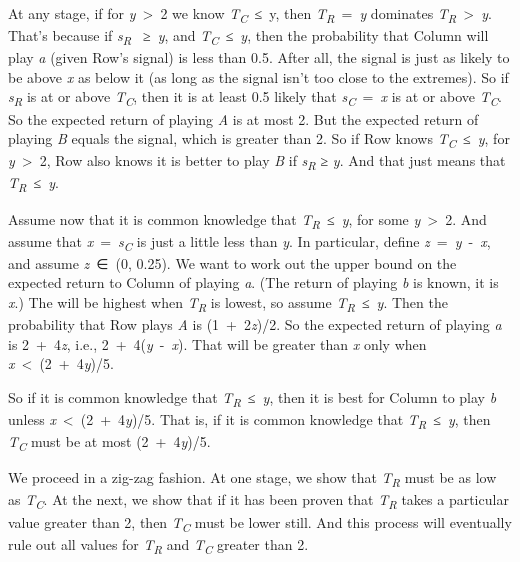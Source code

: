 \documentclass[
  12pt,
  letterpaper,
]{scrbook}
\begin{document}
At any stage, if for \emph{y}~\textgreater~2 we know
\emph{T\textsubscript{C}}~≤~y, then \emph{T\textsubscript{R}}~=~\emph{y}
dominates \emph{T\textsubscript{R}}~\textgreater~\emph{y}. That's
because if \emph{s\textsubscript{R}} ~≥~\emph{y}, and
\emph{T\textsubscript{C}}~≤~\emph{y}, then the probability that Column
will play \emph{a} (given Row's signal) is less than 0.5. After all, the
signal is just as likely to be above \emph{x} as below it (as long as
the signal isn't too close to the extremes). So if
\emph{s\textsubscript{R}} is at or above \emph{T\textsubscript{C}}, then
it is at least 0.5 likely that \emph{s\textsubscript{C}}~=~\emph{x} is
at or above \emph{T\textsubscript{C}}. So the expected return of playing
\emph{A} is at most 2. But the expected return of playing \emph{B}
equals the signal, which is greater than 2. So if Row knows
\emph{T\textsubscript{C}}~≤~\emph{y}, for \emph{y}~\textgreater~2, Row
also knows it is better to play \emph{B} if \emph{s\textsubscript{R}} ≥
\emph{y}. And that just means that \emph{T\textsubscript{R}}~≤~\emph{y}.

Assume now that it is common knowledge that
\emph{T\textsubscript{R}}~≤~\emph{y}, for some \emph{y}~\textgreater~2.
And assume that \emph{x}~=~\emph{s\textsubscript{C}} is just a little
less than \emph{y}. In particular, define
\emph{z}~=~\emph{y}~-~\emph{x}, and assume \emph{z}~∈~(0, 0.25). We want
to work out the upper bound on the expected return to Column of playing
\emph{a}. (The return of playing \emph{b} is known, it is \emph{x}.) The
will be highest when \emph{T\textsubscript{R}} is lowest, so assume
\emph{T\textsubscript{R}}~≤~\emph{y}. Then the probability that Row
plays \emph{A} is (1~+~2\emph{z})/2. So the expected return of playing
\emph{a} is 2~+~4\emph{z}, i.e., 2~+~4(\emph{y}~-~\emph{x}). That will
be greater than \emph{x} only when \emph{x}~\textless~(2~+~4\emph{y})/5.

So if it is common knowledge that \emph{T\textsubscript{R}}~≤~\emph{y},
then it is best for Column to play \emph{b} unless
\emph{x}~\textless~(2~+~4\emph{y})/5. That is, if it is common knowledge
that \emph{T\textsubscript{R}}~≤~\emph{y}, then
\emph{T\textsubscript{C}} must be at most (2~+~4\emph{y})/5.

We proceed in a zig-zag fashion. At one stage, we show that
\emph{T\textsubscript{R}} must be as low as \emph{T\textsubscript{C}}.
At the next, we show that if it has been proven that
\emph{T\textsubscript{R}} takes a particular value greater than 2, then
\emph{T\textsubscript{C}} must be lower still. And this process will
eventually rule out all values for \emph{T\textsubscript{R}} and
\emph{T\textsubscript{C}} greater than 2.
\end{document}
